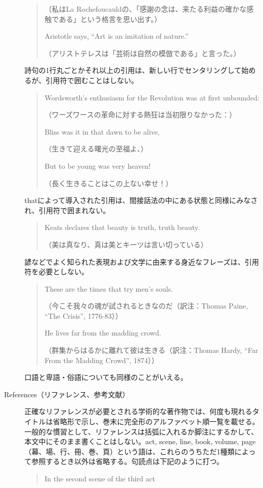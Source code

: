 \begin{description}
\begin{quote}
（私はLa
Rochefoucauldの、「感謝の念は、来たる利益の確かな感触である」という格言を思い出す。）

Aristotle says, ``Art is an imitation of nature.''

（アリストテレスは「芸術は自然の模倣である」と言った。）
\end{quote}
詩句の1行丸ごとかそれ以上の引用は、新しい行でセンタリングして始めるが、引用符で囲むことはしない。
\begin{quote}
    Wordsworth's enthusiasm for the Revolution was at first
unbounded:

（ワーズワースの革命に対する熱狂は当初限りなかった：）

\centering
Bliss was it in that dawn to be alive,

（生きて迎える曙光の至福よ、）

But to be young was very
heaven!

（長く生きることはこの上ない幸せ！）
\end{quote}
thatによって導入された引用は、間接話法の中にある状態と同様にみなされ、引用符で囲まれない。
\begin{quote}
    Keats declares that beauty is truth, truth beauty.
    
    （美は真なり、真は美とキーツは言い切っている）
\end{quote}
諺などでよく知られた表現および文学に由来する身近なフレーズは、引用符を必要としない。
\begin{quote}
    These are the times that try men's souls.
    
    （今こそ我々の魂が試されるときなのだ（訳注：Thomas Paine, ``The
Crisis'', 1776-83））

He lives far from the madding crowd.

（群集からはるかに離れて彼は生きる（訳注：Thomas Hardy, ``Far From
the Madding Crowd'', 1874））
\end{quote}
口語と卑語・俗語についても同様のことがいえる。
\item [References（リファレンス、参考文献）]
正確なリファレンスが必要とされる学術的な著作物では、何度も現れるタイトルは省略形で示し、巻末に完全形のアルファベット順一覧を載せる。一般的な慣習として、リファレンスは括弧に入れるか脚注にするかして、本文中にそのまま書くことはしない。act,
scene, line, book, volume,
page（幕、場、行、冊、巻、頁）という語は、これらのうちただ1種類によって参照するとき以外は省略する。句読点は下記のように打つ。
\begin{quote}
    In the second scene of the third act
    

\end{quote}
\end{description}
